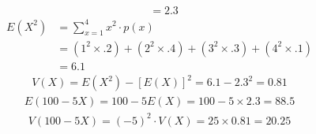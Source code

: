 \documentclass[letterpaper,12pt]{article}
\begin{document}
\begin{enumerate}
\begin{align*}
      &= 2.3
    \end{align*}
    \begin{align*}
      E(X^2) &= \sum_{x = 1}^4 x^2 \cdot p(x) \\
      &= (1^2 \times .2) + (2^2 \times .4) + (3^2 \times .3) + (4^2 \times .1) \\
      &= 6.1
    \end{align*}
    \begin{align*}
      V(X) = E(X^2) - [E(X)]^2 = 6.1 - 2.3^2 = 0.81
    \end{align*}
    \begin{align*}
      E(100 - 5X) = 100 - 5E(X) = 100 - 5 \times 2.3 = 88.5
    \end{align*}
    \begin{align*}
      V(100 - 5X) = (-5)^2 \cdot V(X) = 25 \times 0.81 = 20.25
    \end{align*}
\end{enumerate}
\end{document}
